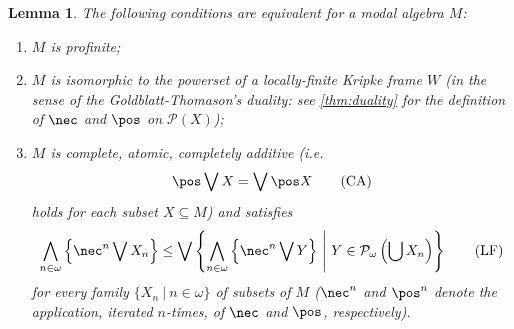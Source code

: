\documentclass{article}
\newtheorem{lem}{Lemma}
\theoremstyle{definition}
\begin{document}
\begin{lem}\label{lem:lf}
The following conditions are equivalent for a modal algebra $M$:
\begin{enumerate}
    \item[\rm (i)] $M$ is profinite;
    \item[\rm (ii)] $M$ is isomorphic to the powerset of a locally-finite Kripke frame $W$ (in the sense of the Goldblatt-Thomason's duality: see \cref{thm:duality} for the definition of $\nec$ and $\pos$ on $\mathcal{P}(X)$);
    \item[\rm (iii)] $M$ is complete, atomic, completely additive (i.e.\
    \begin{align}\label{eq:ca}
    \pos \bigvee X = \bigvee \pos X\tag{CA}
    \end{align}
    holds for each subset $X \subseteq M$) and satisfies
    \begin{align}\label{eq:lf}
    \bigwedge_{n\in \omega} \left\{\nec^n \bigvee X_n\right\} \leq \bigvee \left\{ \bigwedge_{n\in \omega} \left\{ \nec^n \bigvee Y\right\}\ \middle\vert\ Y \in \mathcal{P}_\omega\left(\bigcup X_n\right) \right\}\tag{LF}
    \end{align}
    for every family $\{X_n\ \vert\ n \in \omega\}$ of subsets of $M$ ($\nec^n$ and $\pos^n$ denote the application, iterated $n$-times, of $\nec$ and $\pos$, respectively).
\end{enumerate}
\end{lem}
\end{document}
